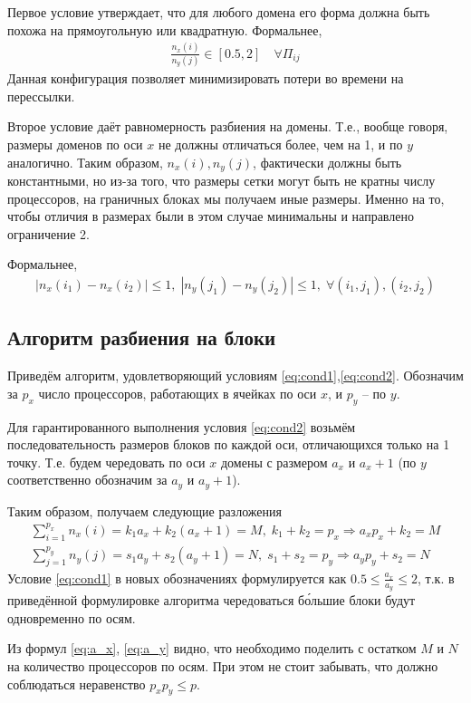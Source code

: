 \documentclass[12pt, fleqn]{article}
\theoremstyle{definition}
\begin{document}
Первое условие утверждает, что для любого домена  его форма должна быть похожа на прямоугольную или квадратную. Формальнее,
\begin{gather}
  \frac{n_x(i)}{n_y(j)} \in [0.5, 2] \quad \forall \Pi_{ij} 
 \label{eq:cond1}
\end{gather}
Данная конфигурация позволяет минимизировать потери во времени на перессылки.

Второе условие даёт равномерность разбиения на домены. Т.е., вообще говоря, размеры доменов по оси $x$ не должны отличаться более, чем на 1, и по $y$ аналогично. Таким образом, $n_x(i), n_y(j)$, фактически должны быть константными, но из-за того, что размеры сетки могут быть не кратны числу процессоров, на граничных блоках мы получаем иные размеры. Именно на то, чтобы отличия в размерах были в этом случае минимальны и направлено ограничение 2. 

Формальнее, 
\begin{gather}
|n_x(i_1) - n_x(i_2)| \leqslant 1, \; |n_y(j_1) - n_y(j_2)| \leqslant 1, \; \forall (i_1, j_1), (i_2, j_2)
\label{eq:cond2}
\end{gather}
\subsection{Алгоритм разбиения на блоки}
Приведём алгоритм, удовлетворяющий условиям \ref{eq:cond1},\ref{eq:cond2}.
Обозначим за $p_x$ число процессоров, работающих в ячейках по оси $x$, и $p_y$ -- по $y$. 

Для гарантированного выполнения условия \ref{eq:cond2} возьмём последовательность размеров блоков по каждой оси, отличающихся только на 1 точку. Т.е. будем чередовать по оси $x$ домены с размером $a_x$ и $a_x+1$ (по $y$ соответственно обозначим за $a_y$ и $a_y+1$).

Таким образом, получаем следующие разложения
\begin{gather}
 \sum\limits_{i=1}^{p_x} n_x(i) = k_1 a_x + k_2 (a_x + 1) = M, \; k_1 + k_2 = p_x \Rightarrow a_x p_x + k_2 = M \label{eq:a_x}\\
  \sum\limits_{j=1}^{p_y} n_y(j) = s_1 a_y + s_2 (a_y + 1) = N, \; s_1 + s_2 = p_y \Rightarrow a_y p_y + s_2 = N \label{eq:a_y}
\end{gather}
Условие \ref{eq:cond1} в новых обозначениях формулируется как
$
 0.5 \leqslant \frac{a_x}{a_y} \leqslant 2
$, т.к. в приведённой формулировке алгоритма чередоваться б\'{о}льшие блоки будут одновременно по осям.

Из формул \ref{eq:a_x}, \ref{eq:a_y} видно, что необходимо поделить с остатком $M$  и $N$ на количество процессоров по осям. При этом не стоит забывать, что должно соблюдаться неравенство $p_x p_y \leqslant p$.
\end{document}
